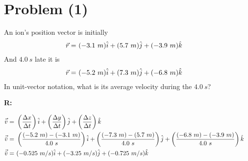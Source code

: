 \section{Problem (1)}
	An ion's position vector is initially
	\begin{align}
		\vec{r} = \ &(-3.1 \ m)\hat{i} + (5.7 \ m)\hat{j} + (-3.9 \ m)\hat{k}& \notag
	\end{align}
	And $4.0 \ s$ late it is
	\begin{align}
		\vec{r} = \ &(-5.2 \ m)\hat{i} + (7.3 \ m)\hat{j} + (-6.8 \ m)\hat{k}& \notag
	\end{align}
	In unit-vector notation, what is its average velocity during the $4.0 \ s$?

	\textbf{R:} \newline

	\begin{align}
		\vec{\bar{v}} = \ &
		\left( \frac{\Delta x}{\Delta t} \right)\hat{i}
		+ \left( \frac{\Delta y}{\Delta t} \right)\hat{j}
		+ \left( \frac{\Delta z}{\Delta t} \right)\hat{k}
		& \notag \\
		\vec{\bar{v}} = \ &
		\left( \frac{(-5.2 \ m) - (-3.1 \ m)}{4.0 \ s} \right)\hat{i}
		+ \left( \frac{(-7.3 \ m) - (5.7 \ m)}{4.0 \ s} \right)\hat{j}
		+ \left( \frac{(-6.8 \ m) - (-3.9 \ m)}{4.0 \ s} \right)\hat{k}
		& \notag \\
		\vec{\bar{v}} = \ &
		( -0.525 \ m/s )\hat{i}
		+ ( -3.25 \ m/s )\hat{j}
		+ ( -0.725 \ m/s )\hat{k}
		&
	\end{align}
